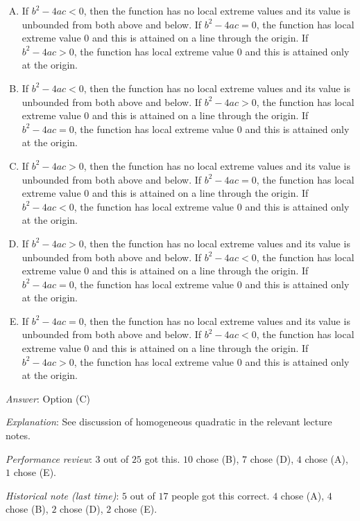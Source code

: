 \documentclass[10pt]{amsart}
\begin{document}
\begin{enumerate}
  \begin{enumerate}[(A)]
  \item If $b^2 - 4ac < 0$, then the function has no local extreme
    values and its value is unbounded from both above and below. If
    $b^2 - 4ac = 0$, the function has local extreme value $0$ and this
    is attained on a line through the origin. If $b^2 - 4ac > 0$, the
    function has local extreme value $0$ and this is attained only at
    the origin.
  \item If $b^2 - 4ac < 0$, then the function has no local extreme
    values and its value is unbounded from both above and below. If
    $b^2 - 4ac > 0$, the function has local extreme value $0$ and this
    is attained on a line through the origin. If $b^2 - 4ac = 0$, the
    function has local extreme value $0$ and this is attained only at
    the origin.
   \item If $b^2 - 4ac > 0$, then the function has no local extreme
    values and its value is unbounded from both above and below. If
    $b^2 - 4ac = 0$, the function has local extreme value $0$ and this
    is attained on a line through the origin. If $b^2 - 4ac < 0$, the
    function has local extreme value $0$ and this is attained only at
    the origin.
  \item If $b^2 - 4ac > 0$, then the function has no local extreme
    values and its value is unbounded from both above and below. If
    $b^2 - 4ac < 0$, the function has local extreme value $0$ and this
    is attained on a line through the origin. If $b^2 - 4ac = 0$, the
    function has local extreme value $0$ and this is attained only at
    the origin.
  \item If $b^2 - 4ac = 0$, then the function has no local extreme
    values and its value is unbounded from both above and below. If
    $b^2 - 4ac < 0$, the function has local extreme value $0$ and this
    is attained on a line through the origin. If $b^2 - 4ac > 0$, the
    function has local extreme value $0$ and this is attained only at
    the origin.
  \end{enumerate}

  {\em Answer}: Option (C)

  {\em Explanation}: See discussion of homogeneous quadratic in the
  relevant lecture notes.

  {\em Performance review}: $3$ out of $25$ got this. $10$ chose (B),
  $7$ chose (D), $4$ chose (A), $1$ chose (E). 

  {\em Historical note (last time)}: $5$ out of $17$ people got this
  correct. $4$ chose (A), $4$ chose (B), $2$ chose (D), $2$ chose (E).



\end{enumerate}
\end{document}
